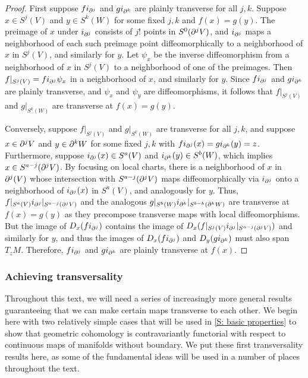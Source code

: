 \begin{proof}
	First suppose $fi_{\partial^j}$ and $gi_{\partial^k}$ are plainly transverse for all $j,k$.
	Suppose $x \in S^j(V)$ and $y \in S^k(W)$ for some fixed $j,k$ and $f(x) = g(y)$.
	The preimage of $x$ under $i_{\partial^j}$ consists of $j!$ points in $S^0(\partial^jV)$, and $i_{\partial^j}$ maps a neighborhood of each such preimage point diffeomorphically to a neighborhood of $x$ in $S^j(V)$, and similarly for $y$.
	Let $\psi_x$ be the inverse diffeomorphism from a neighborhood of $x$ in $S^j(V)$ to a neighborhood of one of the preimages.
	Then $f|_{S^j(V)} = fi_{\partial^j}\psi_x$ in a neighborhood of $x$, and similarly for $y$.
	Since $fi_{\partial^j}$ and $gi_{\partial^k}$ are plainly transverse, and $\psi_x$ and $\psi_y$ are diffeomorphisms, it follows that $f|_{S^j(V)}$ and $g|_{S^k(W)}$ are transverse at $f(x) = g(y)$.

	Conversely, suppose $f|_{S^j(V)}$ and $g|_{S^k(W)}$ are transverse for all $j,k$, and suppose $x \in \partial^jV$ and $y \in \partial^kW$ for some fixed $j,k$ with $fi_{\partial^j}(x) = gi_{\partial^k}(y) = z$.
	Furthermore, suppose $i_{\partial^j}(x) \in S^a(V)$ and $i_{\partial^k}(y) \in S^b(W)$, which implies $x \in S^{a-j}(\partial^j V)$.
	By focusing on local charts, there is a neighborhood of $x$ in $\partial^j(V)$ whose intersection with $S^{a-j}(\partial^j V)$ maps diffeomorphically via $i_{\partial^j}$ onto a neighborhood of $i_{\partial^j}(x)$ in $S^a(V)$, and analogously for $y$.
	Thus, $f|_{S^a(V)}i_{\partial^j}|_{S^{a-j}(\partial^j V)}$ and the analogous $g|_{S^b(W)}i_{\partial^k}|_{S^{b-k}(\partial^k W)}$ are transverse at $f(x) = g(y)$ as they precompose transverse maps with local diffeomorphisms.
	But the image of $D_x(fi_{\partial^j})$ contains the image of $D_x(f|_{S^j(V)}i_{\partial^j}|_{S^{a-j}(\partial^j V)})$ and similarly for $y$, and thus the images of $D_x(fi_{\partial^j})$ and $D_y(gi_{\partial^k})$ must also span $T_{z}M$.
	Therefore, $fi_{\partial^j}$ and $gi_{\partial^k}$ are plainly transverse at $f(x)$.
\end{proof}

\subsubsection{Achieving transversality}

Throughout this text, we will need a series of increasingly more general results guaranteeing that we can make certain maps transverse to each other.
We begin here with two relatively simple cases that will be used in \cref{S: basic properties} to show that geometric cohomology is contravariantly functorial with respect to continuous maps of manifolds without boundary.
We put these first transversality results here, as some of the fundamental ideas will be used in a number of places throughout the text.

